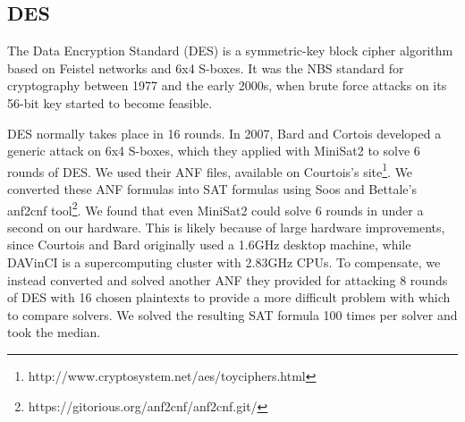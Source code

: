 \subsection{DES}
\label{sec:encoding:des}

The Data Encryption Standard (DES) is a symmetric-key block cipher algorithm based on Feistel networks and 6x4 S-boxes. It was the NBS standard for cryptography between 1977 and the early 2000s, when brute force attacks on its 56-bit key started to become feasible.\cite{Simmons16}

DES normally takes place in 16 rounds. In 2007, Bard and Cortois\cite{CB07} developed a generic attack on 6x4 S-boxes, which they applied with MiniSat2 to solve 6 rounds of DES.  We used their ANF files, available on Courtois's site\footnote{http://www.cryptosystem.net/aes/toyciphers.html}. We converted these ANF formulas into SAT formulas using Soos and Bettale's anf2cnf tool\footnote{https://gitorious.org/anf2cnf/anf2cnf.git/}. We found that even MiniSat2 could solve 6 rounds in under a second on our hardware. This is likely because of large hardware improvements, since Courtois and Bard originally used a 1.6GHz desktop machine, while DAVinCI is a supercomputing cluster with 2.83GHz CPUs. To compensate, we instead converted and solved another ANF they provided for attacking 8 rounds of DES with 16 chosen plaintexts to provide a more difficult problem with which to compare solvers. We solved the resulting SAT formula 100 times per solver and took the median.